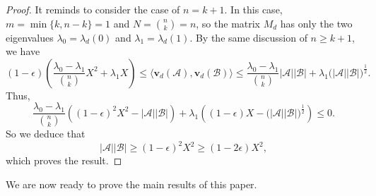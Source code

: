 \documentclass[11pt]{article}
\numberwithin{equation}{section}
\def\A{\mathcal{A}}
\def\B{\mathcal{B}}
\begin{document}
\begin{proof}
It reminds to consider the case of $n=k+1$.
In this case, $m=\min\{k,n-k\}=1$ and $N=\binom{n}{k}=n$, so the matrix $M_d$ has only the two eigenvalues $\lambda_0=\lambda_d(0)$ and $\lambda_1=\lambda_d(1)$.
By the same discussion of $n\geq k+1$, we have
$$
(1-\epsilon)\left( \frac{\lambda _0-\lambda _1}{ \binom{n}{k} } X^2
+\lambda _1  X\right)
\leq
\big\langle \mathbf{v}_d(\A),\mathbf{v}_d(\B)\big\rangle
\leq  \frac{\lambda_0-\lambda_1}{\binom{n}{k}} {|\mathcal A||\mathcal B|} +\lambda_1 \big(|\A||\B|\big)^{\frac{1}{2}}.
$$
Thus,
$$\frac{\lambda _0-\lambda _1}{ \binom{n}{k} }
\left((1-\epsilon)^2 X^2- |\A||\B|\right)
+\lambda _1 \left((1-\epsilon) X-\big(|\A||\B|\big)^{\frac{1}{2}}\right)\leq 0.$$
So we deduce that
$$|\A||\B|\geq (1-\epsilon)^2X^2
\geq(1-2\epsilon) X^2,$$
which proves the result.
\end{proof}


We are now ready to prove the main results of this paper.
\end{document}
